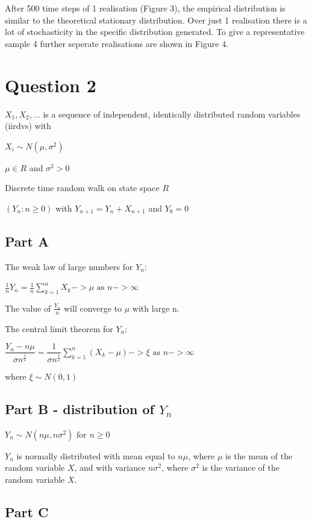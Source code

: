 \documentclass{article}
\begin{document}
After 500 time steps of 1 realisation (Figure 3), the empirical distribution is similar to the theoretical stationary distribution. Over just 1 realisation there is a lot of stochasticity in the specific distribution generated. To give a representative sample 4 further seperate realisations are shown in Figure 4.


\section{Question 2}

$X_1, X_2, ... $ is a sequence of independent, identically distributed random variables (iirdvs) with 

$X_i \sim N(\mu, \sigma^2)$ 

$\mu \in {R}$ and $\sigma^2 > 0$

Discrete time random walk on state space ${R}$

$(Y_n : n \geq 0)$ with $Y_{n+1} = Y_n + X_{n+1}$ and $Y_0 = 0$


\subsection{Part A}

The weak law of large numbers for $Y_n$:

$\frac{1}{n}Y_n = \frac{1}{n}\sum\limits_{k=1}^n X_k -> \mu \text{ as } n -> \infty$

The value of $\frac{Y_n}{n}$ will converge to $\mu$ with large n.

\bigskip
The central limit theorem for $Y_n$:

$\dfrac{Y_n - n\mu}{\sigma n^\frac{1}{2}} = \dfrac{1}{\sigma n^\frac{1}{2}}\sum\limits_{k=1}^n (X_k - \mu) -> \xi \text{ as } n -> \infty$

where $\xi \sim N(0,1)$

\subsection{Part B - distribution of $Y_n$}

$Y_n \sim N(n\mu, n\sigma^2) \text { for } n \geq 0$

$Y_n$ is normally distributed with mean equal to $n\mu$, where $\mu$ is the mean of the random variable $X$, and with variance $n\sigma^2$, where $\sigma^2$ is the variance of the random variable $X$. 

\subsection{Part C}
\end{document}
